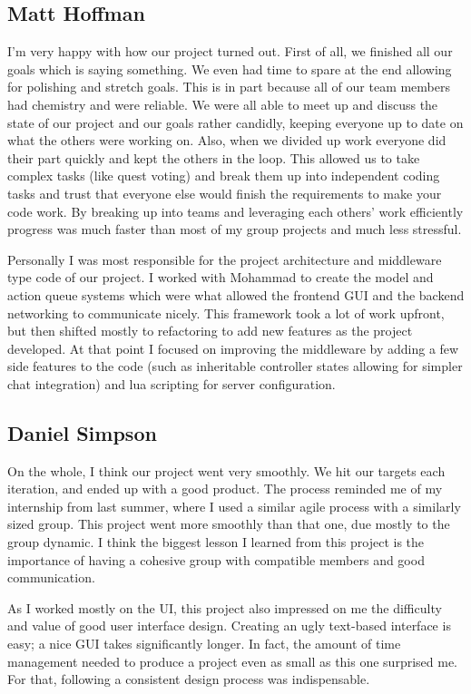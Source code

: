 \documentclass{hitec}
\begin{document}
\subsection{Matt Hoffman}
I’m very happy with how our project turned out. First of all, we finished all our goals which is saying something. We even had time to spare at the end allowing for polishing and stretch goals. This is in part because all of our team members had chemistry and were reliable. We were all able to meet up and discuss the state of our project and our goals rather candidly, keeping everyone up to date on what the others were working on. Also, when we divided up work everyone did their part quickly and kept the others in the loop. This allowed us to take complex tasks (like quest voting) and break them up into independent coding tasks and trust that everyone else would finish the requirements to make your code work. By breaking up into teams and leveraging each others’ work efficiently progress was much faster than most of my group projects and much less stressful.

Personally I was most responsible for the project architecture and middleware type code of our project. I worked with Mohammad to create the model and action queue systems which were what allowed the frontend GUI and the backend networking to communicate nicely. This framework took a lot of work upfront, but then shifted mostly to refactoring to add new features as the project developed. At that point I focused on improving the middleware by adding a few side features to the code (such as inheritable controller states allowing for simpler chat integration) and lua scripting for server configuration.
\subsection{Daniel Simpson}
On the whole, I think our project went very smoothly.  We hit our targets each iteration, and ended up with a good product.  The process reminded me of my internship from last summer, where I used a similar agile process with a similarly sized group.  This project went more smoothly than that one, due mostly to the group dynamic.  I think the biggest lesson I learned from this project is the importance of having a cohesive group with compatible members and good communication.

As I worked mostly on the UI, this project also impressed on me the difficulty and value of good user interface design.  Creating an ugly text-based interface is easy; a nice GUI takes significantly longer.  In fact, the amount of time management needed to produce a project even as small as this one surprised me.  For that, following a consistent design process was indispensable.    
\end{document}
